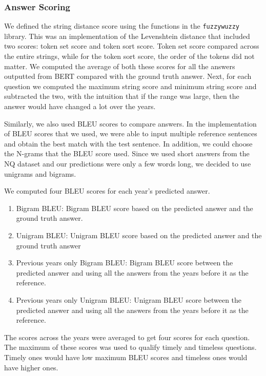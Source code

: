 \documentclass{article}
\begin{document}
\subsubsection{Answer Scoring}
We defined the string distance score using the functions in the {\tt fuzzywuzzy}
library. This was an implementation of the Levenshtein distance that included
two scores: token set score and token sort score. Token set score compared
across the entire strings, while for the token sort score, the order of the
tokens did not matter. We computed the average of both these scores for all the
answers outputted from BERT compared with the ground truth answer. Next, for
each question we computed the maximum string score and minimum string score and
subtracted the two, with the intuition that if the range was large, then the
answer would have changed a lot over the years.

Similarly, we also used BLEU scores to compare answers. In the implementation of
BLEU scores that we used, we were able to input multiple reference sentences and
obtain the best match with the test sentence. In addition, we could choose the
N-grams that the BLEU score used. Since we used short answers from the NQ
dataset and our predictions were only a few words long, we decided to use
unigrams and bigrams.

We computed four BLEU scores for each year’s predicted answer.
\begin{enumerate}
	\item Bigram BLEU: Bigram BLEU score based on the predicted answer and the
	      ground truth answer.
	\item Unigram BLEU: Unigram BLEU score based on the predicted answer and the
	      ground truth answer
	\item Previous years only Bigram BLEU: Bigram BLEU score between the predicted
	      answer and using all the answers from the years before it as the reference.
	\item Previous years only Unigram BLEU: Unigram BLEU score between the
	      predicted answer and using all the answers from the years before it as the
	      reference.
\end{enumerate}

The scores across the years were averaged to get four scores for each question.
The maximum of these scores was used to qualify timely and timeless questions.
Timely ones would have low maximum BLEU scores and timeless ones would have
higher ones.
\end{document}
